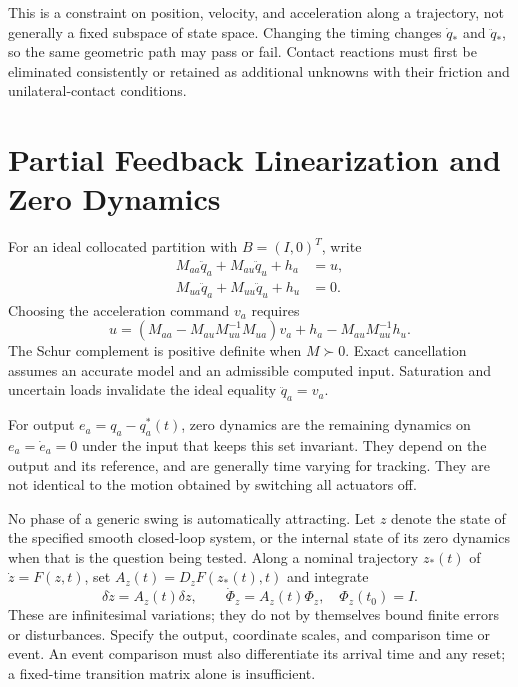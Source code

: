 \documentclass[12pt, openany]{book}
\theoremstyle{plain}
\begin{document}
This is a constraint on position, velocity, and acceleration along a trajectory,
not generally a fixed subspace of state space. Changing the timing changes
$\dot q_*$ and $\ddot q_*$, so the same geometric path may pass or fail.
Contact reactions must first be eliminated consistently or retained as additional
unknowns with their friction and unilateral-contact conditions.

\section{Partial Feedback Linearization and Zero Dynamics}

For an ideal collocated partition with $B=(I,0)^T$, write
\begin{align}
M_{aa}\ddot q_a+M_{au}\ddot q_u+h_a&=u,\\
M_{ua}\ddot q_a+M_{uu}\ddot q_u+h_u&=0.
\end{align}
Choosing the acceleration command $v_a$ requires
\begin{equation}
u=(M_{aa}-M_{au}M_{uu}^{-1}M_{ua})v_a
  +h_a-M_{au}M_{uu}^{-1}h_u.
\end{equation}
The Schur complement is positive definite when $M\succ0$. Exact cancellation
assumes an accurate model and an admissible computed input. Saturation and
uncertain loads invalidate the ideal equality $\ddot q_a=v_a$.

For output $e_a=q_a-q_a^*(t)$, zero dynamics are the remaining dynamics on
$e_a=\dot e_a=0$ under the input that keeps this set invariant. They depend on
the output and its reference, and are generally time varying for tracking.
They are not identical to the motion obtained by switching all actuators off.

No phase of a generic swing is automatically attracting. Let $z$ denote the
state of the specified smooth closed-loop system, or the internal state of
its zero dynamics when that is the question being tested. Along a nominal
trajectory $z_*(t)$ of $\dot z=F(z,t)$, set $A_z(t)=D_zF(z_*(t),t)$ and integrate
\begin{equation}
\delta\dot z=A_z(t)\delta z,\qquad
\dot\Phi_z=A_z(t)\Phi_z,\quad\Phi_z(t_0)=I.
\end{equation}
These are infinitesimal variations; they do not by themselves bound finite
errors or disturbances. Specify the output, coordinate scales, and comparison
time or event. An event comparison must also differentiate its arrival time
and any reset; a fixed-time transition matrix alone is insufficient.
\end{document}
